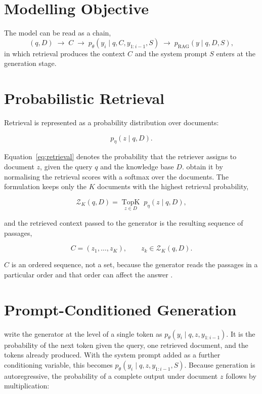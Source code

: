 \documentclass[12pt,a4paper,oneside]{scrreprt}
\begin{document}
\section{Modelling Objective}



The model can be read as a chain,
\[
(q,D) \;\longrightarrow\; C \;\longrightarrow\; p_\theta(y_i \mid q,C,y_{1:i-1},S) \;\longrightarrow\; p_{\mathrm{RAG}}(y \mid q,D,S),
\]
in which retrieval produces the context $C$ and the system prompt $S$ enters at the generation stage.

\section{Probabilistic Retrieval}

Retrieval is represented as a probability distribution over documents:

\begin{equation}
\label{eq:retrieval}
p_\eta(z \mid q,D).
\end{equation}

Equation~\eqref{eq:retrieval} denotes the probability that the retriever assigns to document $z$, given the query $q$ and the knowledge base $D$. \citet{lewis2020rag} obtain it by normalising the retrieval scores with a softmax over the documents.  The formulation keeps only the $K$ documents with the highest retrieval probability,

\begin{equation}
\label{eq:topk}
\mathcal{Z}_K(q,D) = \operatorname*{TopK}_{z \in D} \; p_\eta(z \mid q,D),
\end{equation}

and the retrieved context passed to the generator is the resulting sequence of passages,

\begin{equation}
\label{eq:context}
C = (z_1,\ldots,z_K), \qquad z_k \in \mathcal{Z}_K(q,D).
\end{equation}

$C$ is an ordered sequence, not a set, because the generator reads the passages in a particular order and that order can affect the answer \citep{liu2024lostmiddle}. 

\section{Prompt-Conditioned Generation}

\citet{lewis2020rag} write the generator at the level of a single token as $p_\theta(y_i \mid q,z,y_{1:i-1})$. It is the probability of the next token given the query, one retrieved document, and the tokens already produced. With the system prompt added as a further conditioning variable, this becomes $p_\theta(y_i \mid q,z,y_{1:i-1},S)$. Because generation is autoregressive, the probability of a complete output under document $z$ follows by multiplication:
\end{document}
